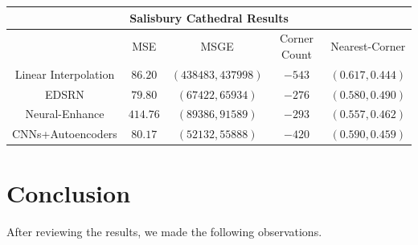 \documentclass[letterpaper,12pt]{article}
\begin{document}
\begin{center}\begin{tabular}{ |c||c|c|c|c| }
    \hline
    \multicolumn{5}{|c|}{Salisbury Cathedral Results} \\
    \hline
    & MSE & MSGE\* & Corner Count & Nearest-Corner\\
    \hline
    Linear Interpolation & $86.20$ & $(438483, 437998)$ & $-543$ & $(0.617, 0.444)$\\
    EDSRN & $79.80$ & $(67422, 65934)$ & $-276$ & $(0.580, 0.490)$\\
    Neural-Enhance & $414.76$ & $(89386, 91589)$ & $-293$ & $(0.557, 0.462)$\\
    CNNs+Autoencoders & $80.17$ & $(52132, 55888)$ & $-420$ & $(0.590, 0.459)$\\
    \hline
\end{tabular}\end{center}


\pagebreak
\section*{Conclusion}

After reviewing the results, we made the following observations.
\end{document}
